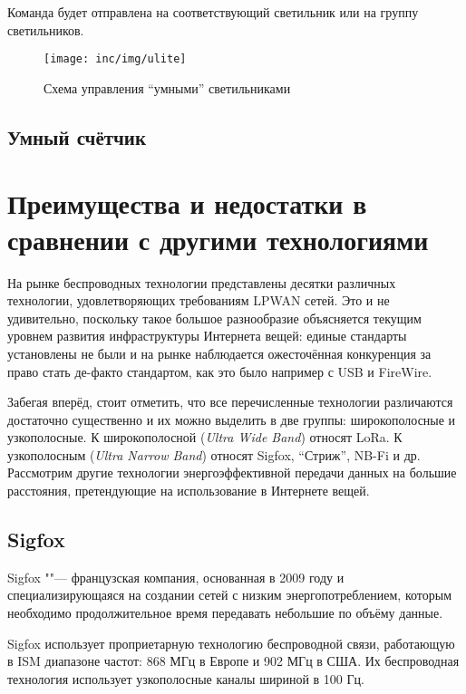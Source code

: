 Команда будет отправлена на соответствующий светильник или на группу светильников.

\begin{figure}[!h]
  \centering
  \texttt{[image: inc/img/ulite]}
  \caption{Схема управления ``умными'' светильниками\cite{isbergsite}}
  \label{fig:ulite}
\end{figure}

\subsection{Умный счётчик}


\section{Преимущества и недостатки в сравнении с другими технологиями}

На рынке беспроводных технологии представлены десятки различных технологии, удовлетворяющих требованиям LPWAN сетей.
Это и не удивительно, поскольку такое большое разнообразие объясняется текущим 
уровнем развития инфраструктуры Интернета вещей: единые стандарты установлены не 
были и на рынке наблюдается ожесточённая конкуренция за право стать де-факто 
стандартом, как это было например с USB и FireWire.

Забегая вперёд, стоит отметить, что все перечисленные технологии различаются 
достаточно существенно и их можно выделить в две группы: широкополосные и 
узкополосные.
К широкополосной (\textit{Ultra Wide Band}) относят LoRa.
К узкополосным (\textit{Ultra Narrow Band}) относят Sigfox, ``Стриж'', NB-Fi и 
др.
Рассмотрим другие технологии энергоэффективной передачи данных на большие 
расстояния, претендующие на использование в Интернете вещей.

\subsection{Sigfox}

Sigfox ""--- французская компания, основанная в 2009 году и специализирующаяся 
на создании сетей с низким энергопотреблением, которым необходимо 
продолжительное время передавать небольшие по объёму данные.

Sigfox использует проприетарную технологию беспроводной связи, работающую в ISM 
диапазоне частот: 868 МГц в Европе и 902 МГц в США. 
Их беспроводная технология использует узкополосные каналы шириной в 100 Гц.

